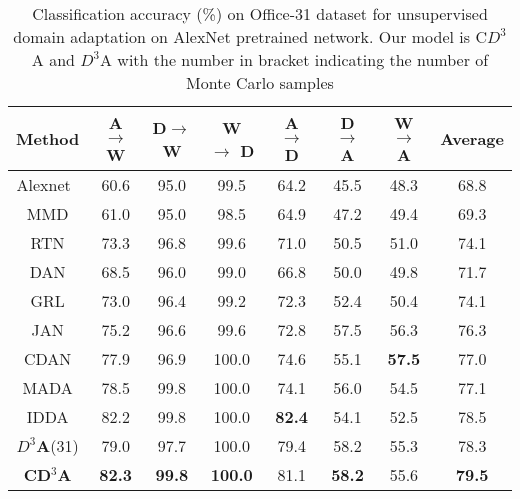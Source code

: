 \documentclass{bmvc2k}
\begin{document}
 \begin{table*}[!h]
 \begin{center}
\begin{tabular}{ |c|c|c|c|c|c|c|c| }
 \hline
  \textbf{Method }& A $\rightarrow$ W & D$\rightarrow$ W &  W $\rightarrow$ D &A $\rightarrow$ D & D $\rightarrow$ A & W $\rightarrow$ A & Average \\ 
  \hline
 Alexnet~\cite{krizhevsky_NIPS2012}  & 60.6 & 95.0   & 99.5 &64.2 & 45.5  & 48.3 & 68.8\\
  MMD\cite{tzeng_arxiv2014} & 61.0  & 95.0  & 98.5 &64.9 & 47.2 & 49.4&69.3 \\ 
  RTN\cite{long_NIPS2016} & 73.3  & 96.8  & 99.6& 71.0& 50.5 & 51.0 & 74.1\\ 
  DAN\cite{long_ICML2015} & 68.5 & 96.0  & 99.0  & 66.8 & 50.0 & 49.8 & 71.7 \\ 
  GRL \cite{ganin_ICML2015} & 73.0 & 96.4  & 99.2  & 72.3  & 52.4  & 50.4 & 74.1\\
  
  JAN \cite{long_icml2017deep} & 75.2  & 96.6  & 99.6  & 72.8  & 57.5  & 56.3 & 76.3\\
CDAN\cite{long_arxive2017conditional} & 77.9  & 96.9  &  100.0  & 74.6  & 55.1  &  \textbf{57.5} & 77.0\\ 
 MADA\cite{pei_arxiv2018} & 78.5  & {99.8 } &  100.0  & 74.1  & 56.0 & 54.5 & 77.1\\ 
 IDDA\cite{kurmi2019looking} & 82.2 & 99.8 & 100.0 & \textbf{82.4} & 54.1 & 52.5& 78.5 \\ 
 \hline
   \textbf{$D^{3}$A}(31)& 79.0 & 97.7 & {100.0 } & {79.4 } & {58.2}  & {55.3} & { 78.3} \\
   \hline
 \textbf{CD$^{3}$A}& \textbf{{82.3}} &\textbf{99.8} &\textbf{100.0} & { 81.1}  &\textbf{ 58.2} & 55.6 & \textbf{79.5} \\ 
 \hline
\end{tabular}
\end{center}
\caption {Classification accuracy (\%) on Office-31 dataset for unsupervised domain adaptation on AlexNet\cite{krizhevsky_NIPS2012} pretrained network. Our model is C$D^{3}$A  and $D^{3}$A with the number in bracket indicating the number of Monte Carlo samples \label{table:office_table}} 
 \end{table*}
\end{document}
